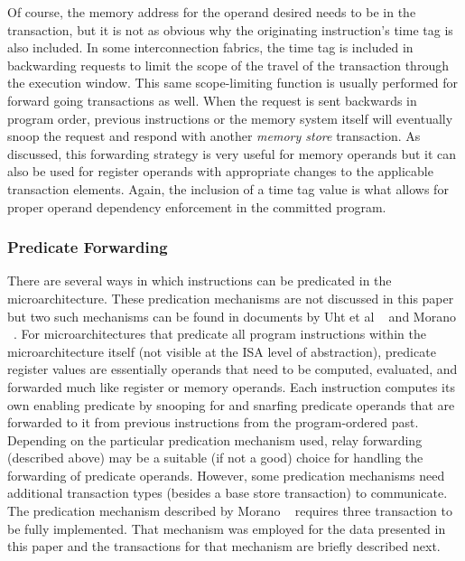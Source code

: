 %
Of course, the memory address for the operand desired
needs to be in the transaction, but it is not as obvious why
the originating instruction's time tag is also included.  In some
interconnection fabrics, the time tag is included in backwarding
requests to limit the scope of the travel of the transaction
through the execution window.  This same scope-limiting function
is usually performed for forward going transactions as well.
When the request is sent backwards in program order, previous
instructions or the memory system itself will eventually snoop
the request and respond with another \textit{memory store}
transaction.
As discussed, this forwarding strategy is very useful for memory
operands but it can also be used for register operands with
appropriate changes to the applicable transaction elements.
Again, the inclusion of a time tag value is what allows
for proper operand dependency enforcement
in the committed program.
%
%
\vspace{-0.25in}
\subsubsection{Predicate Forwarding}
\vspace{-0.15in}
%
There are several ways in which instructions can be predicated
in the microarchitecture.  
These predication mechanisms are not discussed in
this paper but two such mechanisms can be found in
documents by Uht et al ~\cite{Uht01} and Morano ~\cite{Morano02}.
For microarchitectures that predicate all program instructions
within the microarchitecture itself (not visible at the ISA
level of abstraction), predicate register values are essentially
operands that need to be computed, evaluated, and forwarded
much like register or memory operands.
Each instruction computes its own enabling predicate by
snooping for and snarfing predicate operands that are forwarded
to it from previous instructions from the program-ordered past.
Depending on the particular predication mechanism used,
relay forwarding (described above) may be a suitable (if not a good) choice 
for handling the forwarding of predicate operands.
However, some predication mechanisms need additional transaction
types (besides a base store transaction) to communicate.
The predication mechanism described by Morano ~\cite{Morano02}
requires three transaction to be fully implemented.
That mechanism was employed for the data presented in this paper 
and the transactions for that mechanism
are briefly described next.

